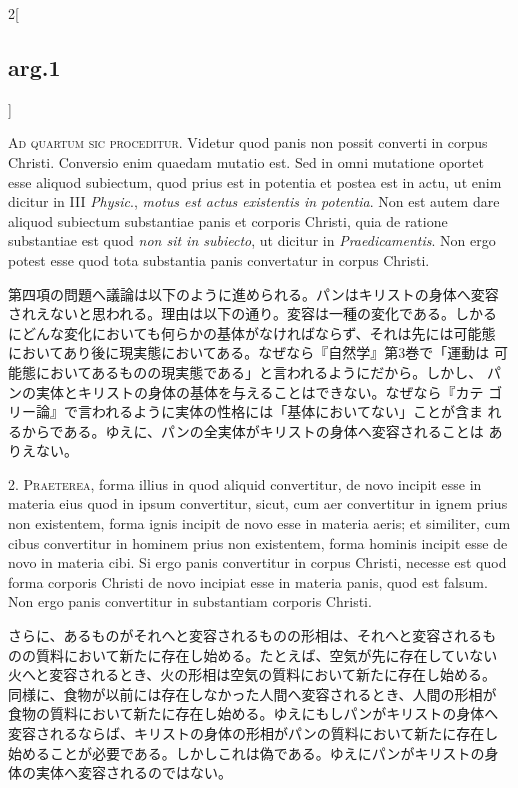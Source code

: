 \documentclass[paper=a4paper,fontsize=10pt,jafontsize=9pt,titlepage]{jlreq}
\begin{document}
\begin{paracol}{2}[\subsection{arg.1}]

{\scshape Ad quartum sic proceditur}. Videtur quod panis non possit
converti in corpus Christi. Conversio enim quaedam mutatio est. Sed in
omni mutatione oportet esse aliquod subiectum, quod prius est in
potentia et postea est in actu, ut enim dicitur in III {\itshape
Physic}., {\itshape motus est actus existentis in potentia}. Non est
autem dare aliquod subiectum substantiae panis et corporis Christi,
quia de ratione substantiae est quod {\itshape non sit in subiecto},
ut dicitur in {\itshape Praedicamentis}. Non ergo potest esse quod
tota substantia panis convertatur in corpus Christi.

\switchcolumn

第四項の問題へ議論は以下のように進められる。パンはキリストの身体へ変容
されえないと思われる。理由は以下の通り。変容は一種の変化である。しかる
にどんな変化においても何らかの基体がなければならず、それは先には可能態
においてあり後に現実態においてある。なぜなら『自然学』第3巻で「運動は
可能態においてあるものの現実態である」と言われるようにだから。しかし、
パンの実体とキリストの身体の基体を与えることはできない。なぜなら『カテ
ゴリー論』で言われるように実体の性格には「基体においてない」ことが含ま
れるからである。ゆえに、パンの全実体がキリストの身体へ変容されることは
ありえない。


2. {\scshape Praeterea}, forma illius in quod aliquid convertitur, de
novo incipit esse in materia eius quod in ipsum convertitur, sicut,
cum aer convertitur in ignem prius non existentem, forma ignis incipit
de novo esse in materia aeris; et similiter, cum cibus convertitur in
hominem prius non existentem, forma hominis incipit esse de novo in
materia cibi. Si ergo panis convertitur in corpus Christi, necesse est
quod forma corporis Christi de novo incipiat esse in materia panis,
quod est falsum. Non ergo panis convertitur in substantiam corporis
Christi.

\switchcolumn

さらに、あるものがそれへと変容されるものの形相は、それへと変容されるも
のの質料において新たに存在し始める。たとえば、空気が先に存在していない
火へと変容されるとき、火の形相は空気の質料において新たに存在し始める。
同様に、食物が以前には存在しなかった人間へ変容されるとき、人間の形相が
食物の質料において新たに存在し始める。ゆえにもしパンがキリストの身体へ
変容されるならば、キリストの身体の形相がパンの質料において新たに存在し
始めることが必要である。しかしこれは偽である。ゆえにパンがキリストの身
体の実体へ変容されるのではない。


\end{paracol}
\end{document}
